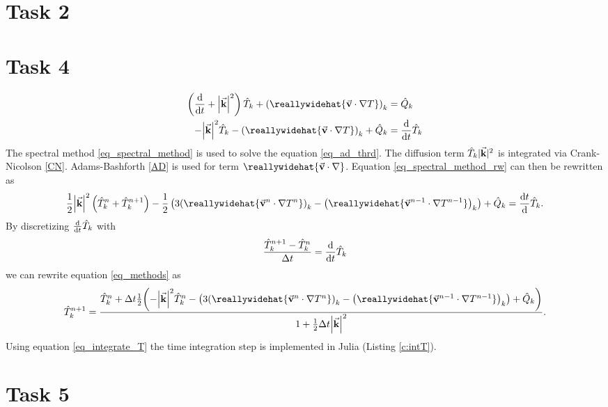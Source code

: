 \documentclass[12pt,a4paper,titlepage,headinclude,bibtotoc]{scrartcl}
\begin{document}
\section{Task 2}


\section{Task 4}
\begin{align}
    \left(\dv{t} + \abs{\va{k}}^2 \right)\hat{T}_k  + {\left(\reallywidehat{\va{v}\cdot \nabla T} \right)}_k &= \hat{Q}_k \label{eq_spectral_method}\\
     -\abs{\va{k}}^2\hat{T}_k - {\left(\reallywidehat{\va{v}\cdot \nabla T} \right)}_k + \hat{Q}_k &= \dv{}{t}\hat{T}_k \label{eq_spectral_method_rw}
\end{align}
The spectral method \eqref{eq_spectral_method} is used to solve the equation \eqref{eq_ad_thrd}.
The diffusion term $\hat{T}_k\vert \va{k} \vert ^2$ is integrated via Crank-Nicolson \ref{CN}.
Adams-Bashforth \ref{AD} is used for term $\reallywidehat{\va{v}\cdot \nabla}$.
Equation \eqref{eq_spectral_method_rw} can then be rewritten as
\begin{equation}
    \frac{1}{2}\abs{\va{k}}^2 \left( \hat{T}^n_k + \hat{T}^{n+1}_k \right) - \frac{1}{2}\left(3\qty(\reallywidehat{\va{v}^n\cdot \nabla T^n})_k   - \qty(\reallywidehat{\va{v}^{n-1}\cdot \nabla T^{n-1}})_k\right) + \hat{Q}_k= \dv{t}{} \hat{T}_k. \label{eq_methods}
\end{equation}
By discretizing $\dv{}{t} \hat{T}_k$ with 
\begin{equation}
    \frac{\hat{T}^{n+1}_k - \hat{T}^n_k}{\Delta t} = \dv{}{t}\hat{T}_k
\end{equation}
we can rewrite equation \eqref{eq_methods} as
\begin{equation}
    \hat{T}^{n+1}_k = \frac{\hat{T}_k^n + \Delta t\frac{1}{2}\qty(-\abs{\va{k}}^2\hat{T}^n_k - \left(3\qty(\reallywidehat{\va{v}^n\cdot \nabla T^n})_k   - \qty(\reallywidehat{\va{v}^{n-1}\cdot \nabla T^{n-1}})_k\right) + \hat{Q}_k)}{1 + \frac{1}{2}\Delta t\abs{\va{k}}^2}. \label{eq_integrate_T}
\end{equation}
Using equation \eqref{eq_integrate_T} the time integration step is implemented in Julia (Listing \ref{c:intT}).

\section{Task 5}
\end{document}
